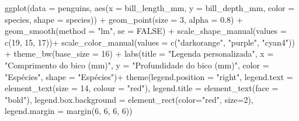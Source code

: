 \documentclass[
]{book}
\newenvironment{Shaded}{\begin{snugshade}}{\end{snugshade}}
\newcommand{\AttributeTok}[1]{\textcolor[rgb]{0.61,0.61,0.61}{#1}}
\newcommand{\ConstantTok}[1]{\textcolor[rgb]{0,0,0}{#1}}
\newcommand{\DecValTok}[1]{\textcolor[rgb]{0.06,0.06,0.06}{#1}}
\newcommand{\FloatTok}[1]{\textcolor[rgb]{0.06,0.06,0.06}{#1}}
\newcommand{\FunctionTok}[1]{\textcolor[rgb]{0,0,0}{#1}}
\newcommand{\NormalTok}[1]{#1}
\newcommand{\SpecialCharTok}[1]{\textcolor[rgb]{0,0,0}{#1}}
\newcommand{\StringTok}[1]{\textcolor[rgb]{0.5,0.5,0.5}{#1}}
\begin{document}
\begin{Shaded}
\begin{Highlighting}[]
\FunctionTok{ggplot}\NormalTok{(}\AttributeTok{data =}\NormalTok{ penguins, }
       \FunctionTok{aes}\NormalTok{(}\AttributeTok{x =}\NormalTok{ bill\_length\_mm, }
           \AttributeTok{y =}\NormalTok{ bill\_depth\_mm,}
           \AttributeTok{color =}\NormalTok{ species,}
           \AttributeTok{shape =}\NormalTok{ species)) }\SpecialCharTok{+}
  \FunctionTok{geom\_point}\NormalTok{(}\AttributeTok{size =} \DecValTok{3}\NormalTok{, }
             \AttributeTok{alpha =} \FloatTok{0.8}\NormalTok{) }\SpecialCharTok{+}
  \FunctionTok{geom\_smooth}\NormalTok{(}\AttributeTok{method =} \StringTok{"lm"}\NormalTok{, }\AttributeTok{se =} \ConstantTok{FALSE}\NormalTok{) }\SpecialCharTok{+}
  \FunctionTok{scale\_shape\_manual}\NormalTok{(}\AttributeTok{values =} \FunctionTok{c}\NormalTok{(}\DecValTok{19}\NormalTok{, }\DecValTok{15}\NormalTok{, }\DecValTok{17}\NormalTok{))}\SpecialCharTok{+}
  \FunctionTok{scale\_color\_manual}\NormalTok{(}\AttributeTok{values =} \FunctionTok{c}\NormalTok{(}\StringTok{"darkorange"}\NormalTok{, }\StringTok{"purple"}\NormalTok{, }\StringTok{"cyan4"}\NormalTok{)) }\SpecialCharTok{+}
  \FunctionTok{theme\_bw}\NormalTok{(}\AttributeTok{base\_size =} \DecValTok{16}\NormalTok{) }\SpecialCharTok{+}
  \FunctionTok{labs}\NormalTok{(}\AttributeTok{title =} \StringTok{"Legenda personalizada"}\NormalTok{, }\AttributeTok{x =} \StringTok{"Comprimento do bico (mm)"}\NormalTok{, }\AttributeTok{y =} \StringTok{"Profundidade do bico (mm)"}\NormalTok{, }
       \AttributeTok{color =} \StringTok{"Espécies"}\NormalTok{, }\AttributeTok{shape =} \StringTok{"Espécies"}\NormalTok{)}\SpecialCharTok{+}
  \FunctionTok{theme}\NormalTok{(}\AttributeTok{legend.position =} \StringTok{"right"}\NormalTok{,}
        \AttributeTok{legend.text =} \FunctionTok{element\_text}\NormalTok{(}\AttributeTok{size =} \DecValTok{14}\NormalTok{, }\AttributeTok{colour =} \StringTok{"red"}\NormalTok{),}
        \AttributeTok{legend.title =} \FunctionTok{element\_text}\NormalTok{(}\AttributeTok{face =} \StringTok{"bold"}\NormalTok{),}
        \AttributeTok{legend.box.background =} \FunctionTok{element\_rect}\NormalTok{(}\AttributeTok{color=}\StringTok{"red"}\NormalTok{, }\AttributeTok{size=}\DecValTok{2}\NormalTok{),}
        \AttributeTok{legend.margin =} \FunctionTok{margin}\NormalTok{(}\DecValTok{6}\NormalTok{, }\DecValTok{6}\NormalTok{, }\DecValTok{6}\NormalTok{, }\DecValTok{6}\NormalTok{))}



\end{Highlighting}
\end{Shaded}
\end{document}

